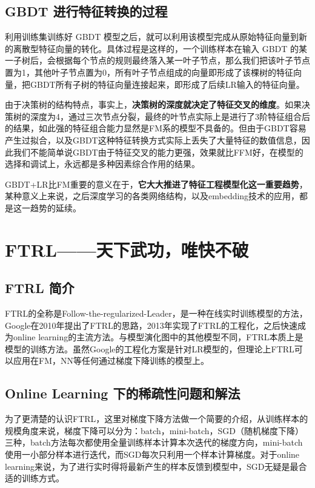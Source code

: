 \documentclass[12pt]{article}
\begin{document}
\subsection{GBDT 进行特征转换的过程}

利用训练集训练好 GBDT 模型之后，就可以利用该模型完成从原始特征向量到新的离散型特征向量的转化。具体过程是这样的，一个训练样本在输入 GBDT 的某一子树后，会根据每个节点的规则最终落入某一叶子节点，那么我们把该叶子节点置为1，其他叶子节点置为0，所有叶子节点组成的向量即形成了该棵树的特征向量，把GBDT所有子树的特征向量连接起来，即形成了后续LR输入的特征向量。

由于决策树的结构特点，事实上，\textbf{决策树的深度就决定了特征交叉的维度}。如果决策树的深度为4，通过三次节点分裂，最终的叶节点实际上是进行了3阶特征组合后的结果，如此强的特征组合能力显然是FM系的模型不具备的。但由于GBDT容易产生过拟合，以及GBDT这种特征转换方式实际上丢失了大量特征的数值信息，因此我们不能简单说GBDT由于特征交叉的能力更强，效果就比FFM好，在模型的选择和调试上，永远都是多种因素综合作用的结果。

GBDT+LR比FM重要的意义在于，\textbf{它大大推进了特征工程模型化这一重要趋势}，某种意义上来说，之后深度学习的各类网络结构，以及embedding技术的应用，都是这一趋势的延续。

\section{FTRL——天下武功，唯快不破}
\subsection{FTRL 简介}
FTRL的全称是Follow-the-regularized-Leader，是一种在线实时训练模型的方法，Google在2010年提出了FTRL的思路，2013年实现了FTRL的工程化，之后快速成为online learning的主流方法。与模型演化图中的其他模型不同，FTRL本质上是模型的训练方法。虽然Google的工程化方案是针对LR模型的，但理论上FTRL可以应用在FM，NN等任何通过梯度下降训练的模型上。

\subsection{Online Learning 下的稀疏性问题和解法}
为了更清楚的认识FTRL，这里对梯度下降方法做一个简要的介绍，从训练样本的规模角度来说，梯度下降可以分为：batch，mini-batch，SGD（随机梯度下降）三种，batch方法每次都使用全量训练样本计算本次迭代的梯度方向，mini-batch使用一小部分样本进行迭代，而SGD每次只利用一个样本计算梯度。对于online learning来说，为了进行实时得将最新产生的样本反馈到模型中，SGD无疑是最合适的训练方式。
\end{document}
